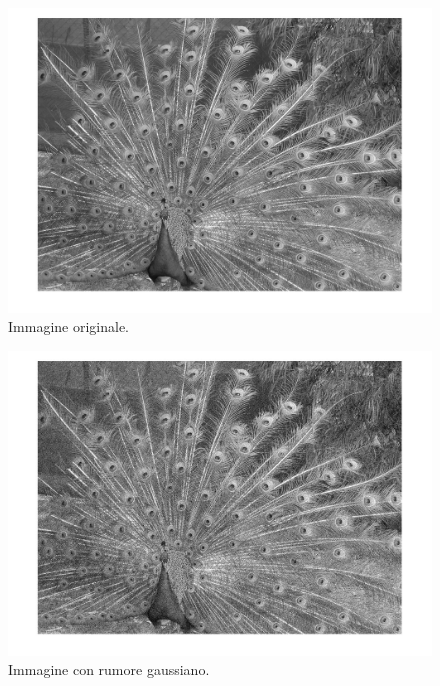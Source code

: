 \documentclass[a4paper]{article}
\begin{document}
	\begin{figure}[!htp]
		\centering
		\includegraphics[width=.9\textwidth]{img/lab/operato-locali-7.jpg}
		\caption{Immagine originale.}
	\end{figure}
	\begin{figure}[!htp]
		\centering
		\includegraphics[width=.9\textwidth]{img/lab/operato-locali-8.jpg}
		\caption{Immagine con rumore gaussiano.}
	\end{figure}\newpage
	
\end{document}
